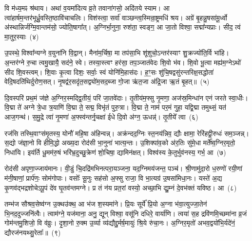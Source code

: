 वि म॑ध्य॒मꣴ श्र॑थाय। अथा॑ व॒यमा॑दित्य व्र॒ते तवाना॑गसो॒ अदि॑तये स्याम। आ त्वा॑हार्\mbox{}षम॒न्तर॑भूर्ध्रु॒वस्ति॒ष्ठा\-वि॑चाचलिः। विश॑स्त्वा॒ सर्वा॑ वाञ्छन्त्व॒स्मिन्रा॒ष्ट्रमधि॑ श्रय। अग्रे॑ बृ॒हन्नु॒षसा॑मू॒र्ध्वो अ॑स्थान्निर्जग्मि॒वान्तम॑सो॒ ज्योति॒षागा᳚त्। अ॒ग्निर्भा॒नुना॒ रुश॑ता॒ स्वङ्ग॒ आ जा॒तो विश्वा॒ सद्मा᳚न्यप्राः। सीद॒ त्वं मा॒तुर॒स्याः~(४)

उ॒पस्थे॒ विश्वा᳚न्यग्ने व॒युना॑नि वि॒द्वान्। मैना॑म॒र्चिषा॒ मा तप॑सा॒भि शू॑शुचो॒\-ऽन्तर॑स्याꣳ शु॒क्रज्यो॑ति॒र्वि भा॑हि। अ॒न्तर॑ग्ने रु॒चा त्वमु॒खायै॒ सद॑ने॒ स्वे। तस्या॒स्त्वꣳ हर॑सा॒ तप॒ञ्जात॑वेदः शि॒वो भ॑व। शि॒वो भू॒त्वा मह्य॑म॒ग्ने\-ऽथो॑ सीद शि॒वस्त्वम्। शि॒वाः कृ॒त्वा दिशः॒ सर्वाः॒ स्वं योनि॑मि॒हास॑दः। ह॒ꣳ॒सः शु॑चि॒षद्वसु॑रन्तरिक्ष॒सद्धोता॑ वेदि॒षदति॑थिर्दुरोण॒सत्। नृ॒षद्व॑र॒सदृ॑त॒सद्व्यो॑म॒सद॒ब्जा गो॒जा ऋ॑त॒जा अ॑द्रि॒जा ऋ॒तं बृ॒हत्॥~(५)

{\anuvakamend[{दिव॒मनु॒ वि क्र॑मस्व॒ निर्भ॑क्तः॒ स यं द्वि॒ष्मो विष्णो॒र्धने॒नाग्ने॑\-ऽध॒मम॒स्याः शु॑चि॒षथ्षोड॑श च}]}%

दि॒वस्परि॑ प्रथ॒मं ज॑ज्ञे अ॒ग्निर॒स्मद्द्वि॒तीयं॒ परि॑ जा॒तवे॑दाः। तृ॒तीय॑म॒फ्सु नृ॒मणा॒ अज॑स्र॒मिन्धा॑न एनं जरते स्वा॒धीः। वि॒द्मा ते॑ अग्ने त्रे॒धा त्र॒याणि॑ वि॒द्मा ते॒ सद्म॒ विभृ॑तं पुरु॒त्रा। वि॒द्मा ते॒ नाम॑ पर॒मं गुहा॒ यद्वि॒द्मा तमुथ्सं॒ यत॑ आज॒गन्थ॑। स॒मु॒द्रे त्वा॑ नृ॒मणा॑ अ॒फ्स्व॑न्तर्नृ॒चक्षा॑ ईधे दि॒वो अ॑ग्न॒ ऊधन्न्॑। तृ॒तीये᳚ त्वा~(६)

रज॑सि तस्थि॒वाꣳस॑मृ॒तस्य॒ योनौ॑ महि॒षा अ॑हिन्वन्न्। अक्र॑न्दद॒ग्निः स्त॒नय॑न्निव॒ द्यौः क्षामा॒ रेरि॑हद्वी॒रुधः॑ सम॒ञ्जन्न्। स॒द्यो ज॑ज्ञा॒नो वि हीमि॒द्धो अख्य॒दा रोद॑सी भा॒नुना॑ भात्य॒न्तः। उ॒शिक्पा॑व॒को अ॑र॒तिः सु॑मे॒धा मर्ते᳚ष्व॒ग्निर॒मृतो॒ निधा॑यि। इय॑र्ति धू॒मम॑रु॒षं भरि॑भ्र॒दुच्छु॒क्रेण॑ शो॒चिषा॒ द्यामिन॑क्षत्। विश्व॑स्य के॒तुर्भुव॑नस्य॒ गर्भ॒ आ~(७)

रोद॑सी अपृणा॒ज्जाय॑मानः। वी॒डुं चि॒दद्रि॑मभिनत्परा॒यञ्जना॒ यद॒ग्निमय॑जन्त॒ पञ्च॑। श्री॒णामु॑दा॒रो ध॒रुणो॑ रयी॒णां म॑नी॒षाणां॒ प्रार्प॑णः॒ सोम॑गोपाः। वसोः᳚ सू॒नुः सह॑सो अ॒फ्सु राजा॒ वि भा॒त्यग्र॑ उ॒षसा॑मिधा॒नः। यस्ते॑ अ॒द्य कृ॒णव॑द्भद्रशोचे\-ऽपू॒पं दे॑व घृ॒तव॑न्तमग्ने। प्र तं न॑य प्रत॒रां वस्यो॒ अच्छा॒भि द्यु॒म्नं दे॒वभ॑क्तं यविष्ठ। आ~(८)

तम्भ॑ज सौश्रव॒सेष्व॑ग्न उ॒क्थउ॑क्थ॒ आ भ॑ज श॒स्यमा॑ने। प्रि॒यः सूर्ये᳚ प्रि॒यो अ॒ग्ना भ॑वा॒त्युज्जा॒तेन॑ भि॒नद॒दुज्जनि॑त्वैः। त्वाम॑ग्ने॒ यज॑माना॒ अनु॒ द्यून् विश्वा॒ वसू॑नि दधिरे॒ वार्या॑णि। त्वया॑ स॒ह द्रवि॑णमि॒च्छमा॑ना व्र॒जं गोम॑न्तमु॒शिजो॒ वि व॑व्रुः। दृ॒शा॒नो रु॒क्म उ॒र्व्या व्य॑द्यौद्दु॒र्मर्\mbox{}ष॒मायुः॑ श्रि॒ये रु॑चा॒नः। अ॒ग्निर॒मृतो॑ अभव॒द्वयो॑भि॒र्यदे॑नं॒ द्यौरज॑नयथ्सु॒रेताः᳚॥~(९)

